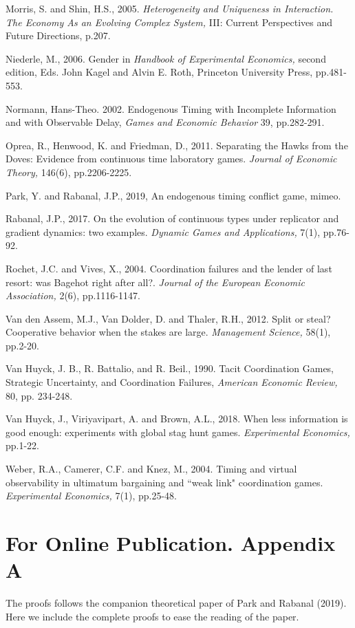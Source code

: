 \documentclass[11pt, letterpaper]{article}
\theoremstyle{plain}
\begin{document}
\begin{thebibliography}{10}
\bibitem{} Morris, S. and Shin, H.S., 2005. \textit{Heterogeneity and Uniqueness in Interaction. The Economy As an Evolving Complex System,} III: Current Perspectives and Future Directions, p.207.

\bibitem{} Niederle, M., 2006. Gender in \textit{Handbook of Experimental Economics,} second edition, Eds. John Kagel and Alvin E. Roth, Princeton University Press, pp.481-553.

\bibitem{} Normann, Hans-Theo. 2002. Endogenous Timing with Incomplete Information and with Observable Delay, \textit{Games and Economic Behavior} 39, pp.282-291.

\bibitem{} Oprea, R., Henwood, K. and Friedman, D., 2011. Separating the Hawks from the Doves: Evidence from continuous time laboratory games. \textit{Journal of Economic Theory,} 146(6), pp.2206-2225.

\bibitem{} Park, Y. and Rabanal, J.P., 2019, An endogenous timing conflict game, mimeo. 

\bibitem{} Rabanal, J.P., 2017. On the evolution of continuous types under replicator and gradient dynamics: two examples. \textit{Dynamic Games and Applications,} 7(1), pp.76-92.

\bibitem{} Rochet, J.C. and Vives, X., 2004. Coordination failures and the lender of last resort: was Bagehot right after all?. \textit{Journal of the European Economic Association,} 2(6), pp.1116-1147.

\bibitem{} Van den Assem, M.J., Van Dolder, D. and Thaler, R.H., 2012. Split or steal? Cooperative behavior when the stakes are large. \textit{Management Science,} 58(1), pp.2-20.

\bibitem{}  Van Huyck, J. B., R. Battalio, and R. Beil., 1990. Tacit Coordination Games, Strategic Uncertainty, and Coordination Failures, \textit{American Economic Review,} 80, pp. 234-248.

\bibitem{} Van Huyck, J., Viriyavipart, A. and Brown, A.L., 2018. When less information is good enough: experiments with global stag hunt games. \textit{Experimental Economics,} pp.1-22.

\bibitem{} Weber, R.A., Camerer, C.F. and Knez, M., 2004. Timing and virtual observability in ultimatum bargaining and ``weak link" coordination games. \textit{Experimental Economics,} 7(1), pp.25-48.


\end{thebibliography}

\newpage
\section*{For Online Publication. Appendix A}
The proofs follows the companion theoretical paper of Park and Rabanal (2019). Here we include the complete proofs to ease the reading of the paper. 
\end{document}
